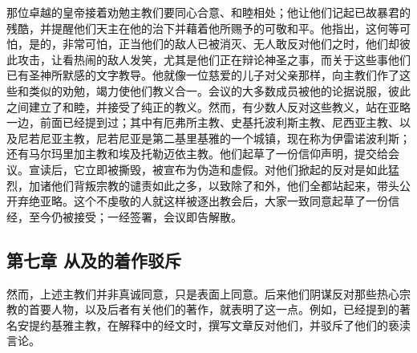 那位卓越的皇帝接着劝勉主教们要同心合意、和睦相处；他让他们记起已故暴君的残酷，并提醒他们天主在他的治下并藉着他所赐予的可敬和平。他指出，这何等可怕，是的，非常可怕，正当他们的敌人已被消灭、无人敢反对他们之时，他们却彼此攻击，让看热闹的敌人发笑，尤其是他们正在辩论神圣之事，而关于这些事他们已有圣神所默感的文字教导。他就像一位慈爱的儿子对父亲那样，向主教们作了这些和类似的劝勉，竭力使他们教义合一。会议的大多数成员被他的论据说服，彼此之间建立了和睦，并接受了纯正的教义。然而，有少数人反对这些教义，站在亚略一边，前面已经提到过；其中有厄弗所主教、史基托波利斯主教、尼西亚主教、以及尼若尼亚主教，尼若尼亚是第二基里基雅的一个城镇，现在称为伊雷诺波利斯；还有马尔玛里加主教和埃及托勒迈依主教。他们起草了一份信仰声明，提交给会议。宣读后，它立即被撕毁，被宣布为伪造和虚假。对他们掀起的反对是如此猛烈，加诸他们背叛宗教的谴责如此之多，以致除了和外，他们全都站起来，带头公开弃绝亚略。这个不虔敬的人就这样被逐出教会后，大家一致同意起草了一份信经，至今仍被接受；一经签署，会议即告解散。\par


\subsection{第七章 从及的着作驳斥}

然而，上述主教们并非真诚同意，只是表面上同意。后来他们阴谋反对那些热心宗教的首要人物，以及后者有关他们的著作，就表明了这一点。例如，已经提到的著名安提约基雅主教，在解释中的经文时，撰写文章反对他们，并驳斥了他们的亵渎言论。\par

\par

